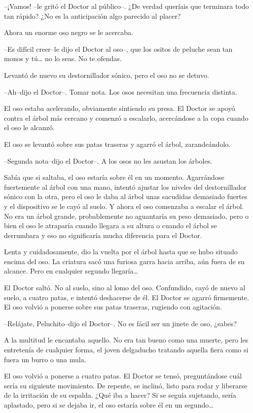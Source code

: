 --¡Vamos! --le gritó el Doctor al público--. ¿De verdad queríais que
terminara todo tan rápido? ¿No es la anticipación algo parecido al
placer?

Ahora un enorme oso negro se le acercaba.

--Es difícil creer--le dijo el Doctor al oso--, que los ositos de
peluche sean tan monos y tú\ldots{} no lo seas. No te ofendas.

Levantó de nuevo su destornillador sónico, pero el oso no se detuvo.

--Ah--dijo el Doctor--. Tomar nota. Los osos necesitan una frecuencia
distinta.

El oso estaba acelerando, obviamente sintiendo su presa. El Doctor se
apoyó contra el árbol más cercano y comenzó a escalarlo, acercándose a
la copa cuando el oso le alcanzó.

El oso se levantó sobre sus patas traseras y agarró el árbol,
zarandeándolo.

--Segunda nota--dijo el Doctor--. A los osos no les asustan los árboles.

Sabía que si saltaba, el oso estaría sobre él en un momento. Agarrándose
fuertemente al árbol con una mano, intentó ajustar los niveles del
destornillador sónico con la otra, pero el oso le daba al árbol unas
sacudidas demasiado fuertes y el dispositivo se le cayó al suelo. Y
ahora el oso comenzaba a escalar el árbol. No era un árbol grande,
probablemente no aguantaría su peso demasiado, pero o bien el oso le
atraparía cuando llegara a su altura o cuando el árbol se derrumbara y
eso no significaría mucha diferencia para el Doctor.

Lenta y cuidadosamente, dio la vuelta por el árbol hasta que se hubo
situado encima del oso. La criatura sacó una furiosa garra hacia arriba,
aún fuera de su alcance. Pero en cualquier segundo llegaría\ldots{}

El Doctor saltó. No al suelo, sino al lomo del oso. Confundido, cayó de
nuevo al suelo, a cuatro patas, e intentó deshacerse de él. El Doctor se
agarró firmemente. El oso volvió a ponerse sobre sus patas traseras,
rugiendo con agitación.

--Relájate, Peluchito--dijo el Doctor--. No es fácil ser un jinete de
oso, ¿sabes?

A la multitud le encantaba aquello. No era tan bueno como una muerte,
pero les entretenía de cualquier forma, el joven delgaducho tratando
aquella fiera como si fuera un burro o una mula.

El oso volvió a ponerse a cuatro patas. El Doctor se tensó,
preguntándose cuál sería su siguiente movimiento. De repente, se
inclinó, listo para rodar y liberarse de la irritación de su espalda.
¿Qué iba a hacer? Si se seguía sujetando, sería aplastado, pero si se
dejaba ir, el oso estaría sobre él en un segundo\ldots{}

